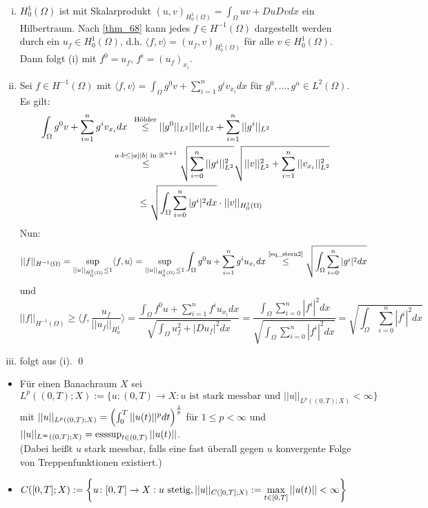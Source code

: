 	\begin{enumerate}[(i)]
	\item $H_0^1(\Omega)$ ist mit Skalarprodukt $(u,v)_{H_0^1(\Omega)} = \int_{\Omega} uv + Du Dv dx$ ein Hilbertraum. Nach \ref{thm_68} kann jedes $f \in H^{-1}(\Omega)$ dargestellt werden durch ein $u_f \in H_0^1(\Omega)$, d.h. $\langle f,v \rangle = (u_f,v)_{H_0^1(\Omega)}$ für alle $v \in H_0^1(\Omega)$. Dann folgt (i) mit $f^0 = u_f$, $f^i = (u_f) _{x_i}$.
	\item Sei $f \in H^{-1}(\Omega)$ mit $\langle f,v \rangle = \int_{\Omega} g^0 v + \sum_{i=1}^n g^i v_{x_i} dx$ für $g^0,\dots,g^n \in L^2(\Omega)$. Es gilt:
	\begin{equation}
	\begin{aligned}
		\int_{\Omega} g^0 v + \sum\limits_{i=1}^{n} g^i v_{x_i} dx \quad &\hspace{-2mm}\overset{\text{Hölder}}{\leq} ||g^0||_{L^2} ||v||_{L^2} + \sum\limits_{i=1}^{n} ||g^i||_{L^2} \\
		&\hspace{-9mm}\overset{a \cdot b \leq |a||b| \text{ in } \RR^{n+1}}{\leq} \sqrt{\sum\limits_{i=0}^{n} ||g^i||_{L^2}^2} \sqrt{||v||_{L^2}^2 + \sum\limits_{i=1}^n ||v_{x_i}||_{L^2}^2} \\
		&\leq \sqrt{\int_{\Omega} \sum\limits_{i=0}^n |g^i|^2 dx} \cdot ||v||_{H_0^1(\Omega)} \label{eq_stern2}
	\end{aligned}
	\end{equation}
	Nun:
	\[ ||f||_{H^{-1}(\Omega)} = \sup\limits_{||u||_{H_0^1(\Omega)} \leq 1} \langle f,u \rangle = \sup\limits_{||u||_{H_0^1(\Omega)} \leq 1} \int_{\Omega} g^0 u + \sum_{i=1}^n g^i u_{x_i} dx \overset{\text{\eqref{eq_stern2}}}{\leq} \sqrt{\int_{\Omega} \sum\limits_{i=0}^{n} |g^i|^2 dx} \]
	und
	\[ ||f||_{H^{-1}(\Omega)} \geq \langle f,\frac{u_f}{||u_f||_{H_0^1}} \rangle = \frac{\int_{\Omega} f^0 u + \sum\limits_{i=1}^{n} f^i u_{x_i} dx}{\sqrt{\int_\Omega u_f^2 + |Du_f|^2 dx}} = \frac{\int_{\Omega} \sum\limits_{i=0}^{n} |f^i|^2 dx}{\sqrt{\int_\Omega \sum\limits_{i=0}^{n} |f^i|^2 dx}} = \sqrt{\int_{\Omega} \sum\limits_{i=0}^{n} |f^i|^2 dx} \]
	\item folgt aus (i). \qed
	\end{enumerate}
	
\begin{defn}[$L^p$-Raum]
\begin{itemize}
	\item Für einen Banachraum $X$ sei
	\[L^p((0,T);X) := \{ u \colon (0,T) \rightarrow X : u \text{ ist stark messbar und } ||u||_{L^p((0,T);X)} < \infty\} \]
	mit $||u||_{L^p((0,T);X)} = \enbrace*{ \int_{0}^{T} ||u(t)||^p dt}^{\frac{1}{p}}$ für $1 \leq p < \infty$ und $||u||_{L^\infty((0,T);X)} = \esssup_{t \in (0,T)} ||u(t)||$. \\
	(Dabei heißt $u$ stark messbar, falls eine fast überall gegen $u$ konvergente Folge von Treppenfunktionen existiert.)
	\item $C([0,T];X) := \penbrace*{ u\colon [0,T] \rightarrow X : u \text{ stetig}, ||u||_{C([0,T];X)} := \max\limits_{t \in [0,T]} ||u(t)|| < \infty}$
\end{itemize}
\end{defn}

